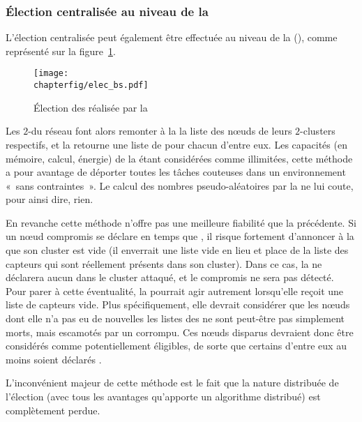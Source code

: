         \subsubsection{Élection centralisée au niveau de la \sdb}
L'élection centralisée peut également être effectuée au niveau de la \sdb (\BS), comme représenté sur la figure~\ref{sa:fig:elecbs}.
\begin{figure}[ht]
    \centering
    \texttt{[image: \\chapterfig/elec\_bs.pdf]}
    \caption{Élection des \cns réalisée par la \sdb}\label{sa:fig:elecbs}
\end{figure}
Les $2$-\CH du réseau font alors remonter à la \BS la liste des nœuds de leurs $2$-clusters respectifs, et la \BS retourne une liste de \cns pour chacun d'entre eux.
Les capacités (en mémoire, calcul, énergie) de la \sdb étant considérées comme illimitées, cette méthode a pour avantage de déporter toutes les tâches couteuses dans un environnement «~sans contraintes~».
Le calcul des nombres pseudo-aléatoires par la \sdb ne lui coute, pour ainsi dire, rien.

En revanche cette méthode n'offre pas une meilleure fiabilité que la précédente.
Si un nœud compromis se déclare en temps que \CH, il risque fortement d'annoncer à la \BS que son cluster est vide (il enverrait une liste vide en lieu et place de la liste des capteurs qui sont réellement présents dans son cluster).
Dans ce cas, la \sdb ne déclarera aucun \cn dans le cluster attaqué, et le \CH compromis ne sera pas détecté.
Pour parer à cette éventualité, la \sdb pourrait agir autrement lorsqu'elle reçoit une liste de capteurs vide.
Plus spécifiquement, elle devrait considérer que les nœuds dont elle n'a pas eu de nouvelles \via les listes des \CH ne sont peut-être pas simplement morts, mais escamotés par un \ch corrompu.
Ces nœuds disparus devraient donc être considérés comme potentiellement éligibles, de sorte que certains d'entre eux au moins soient déclarés \cns.

L'inconvénient majeur de cette méthode est le fait que la nature distribuée de l'élection (avec tous les avantages qu'apporte un algorithme distribué) est complètement
perdue.

